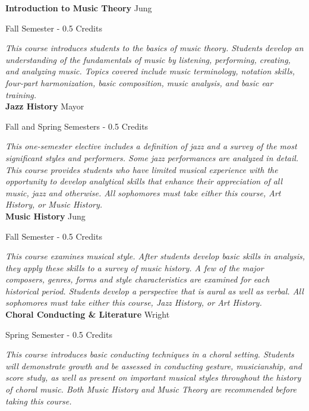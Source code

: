 \noindent\textbf{Introduction to Music Theory} \hfill Jung

\noindent Fall Semester - 0.5 Credits

\vspace{1mm}\emph{This course introduces students to the basics of music theory. Students develop an understanding of the fundamentals of music by listening, performing, creating, and analyzing music. Topics covered include music terminology, notation skills, four-part harmonization, basic composition, music analysis, and basic ear training.}\\




\noindent\textbf{Jazz History} \hfill Mayor

\noindent Fall and Spring Semesters - 0.5 Credits

\vspace{1mm}\emph{This one-semester elective includes a definition of jazz and a survey of the most significant styles and performers. Some jazz performances are analyzed in detail. This course provides students who have limited musical experience with the opportunity to develop analytical skills that enhance their appreciation of all music, jazz and otherwise. All sophomores must take either this course, Art History, or Music History. }\\






\noindent\textbf{Music History} \hfill Jung

\noindent Fall Semester - 0.5 Credits

\vspace{1mm}\emph{This course examines musical style. After students develop basic skills in analysis, they apply these skills to a survey of music history. A few of the major composers, genres, forms and style characteristics are examined for each historical period. Students develop a perspective that is aural as well as verbal. All sophomores must take either this course, Jazz History, or Art History.}\\

\noindent\textbf{Choral Conducting \& Literature} \hfill Wright

\noindent Spring Semester - 0.5 Credits

\vspace{1mm}\emph{This course introduces basic conducting techniques in a choral setting. Students will demonstrate growth and be assessed in conducting gesture, musicianship, and score study, as well as present on important musical styles throughout the history of choral music. Both Music History and Music Theory are recommended before taking this course.}\\

